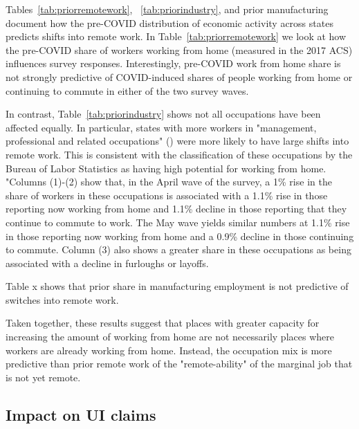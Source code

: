 \documentclass[12pt]{article}
\begin{document}


Tables~\ref{tab:priorremotework}, ~\ref{tab:priorindustry}, and prior manufacturing document how the pre-COVID distribution of economic activity across states predicts shifts into remote work. In Table~\ref{tab:priorremotework} we look at how the pre-COVID share of workers working from home (measured in the 2017 ACS) influences survey responses.  Interestingly, pre-COVID work from home share is not strongly predictive of COVID-induced shares of people working from home or continuing to commute in either of the two survey waves. 

In contrast, Table~\ref{tab:priorindustry} shows not all occupations have been affected equally.  In particular, states with more workers in "management, professional and related occupations" (\cite{krantz2019did}) were more likely to have large shifts into remote work. This is consistent with the classification of these occupations by the Bureau of Labor Statistics as having high potential for working from home. "Columns (1)-(2) show that, in the April wave of the survey, a 1\% rise in the share of workers in these occupations is associated with a 1.1\% rise in those reporting now working from home and 1.1\% decline in those reporting that they continue to commute to work. The May wave yields similar numbers at 1.1\% rise in those reporting now working from home and a 0.9\% decline in those continuing to commute. Column (3) also shows a greater share in these occupations as being associated with a decline in furloughs or layoffs. 

Table x shows that prior share in manufacturing employment is not predictive of switches into remote work. 

Taken together, these results suggest that places with greater capacity for increasing the amount of working from home are not necessarily places where workers are already working from home.  Instead, the occupation mix is more predictive than prior remote work of the "remote-ability" of the marginal job that is not yet remote.







\subsection{Impact on UI claims} \label{sec:UI}
\end{document}
